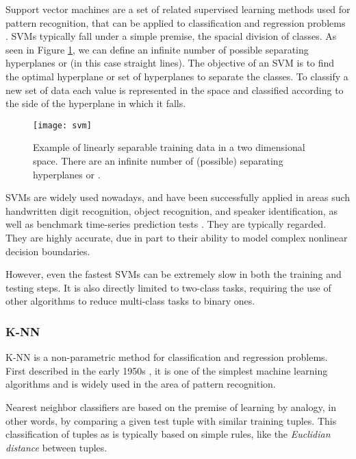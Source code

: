 Support vector machines are a set of related supervised learning methods used
for pattern recognition, that can be applied to classification and regression
problems \cite{Cortes1995}. SVMs typically fall under a simple premise, the
spacial division of classes. As seen in Figure \ref{fig:svm}, we can define an
infinite number of possible separating hyperplanes or 
(in this case straight lines). The objective of an SVM is to find the optimal
hyperplane or set of hyperplanes to separate the classes. To classify a new set
of data each value is represented in the space and classified according to the
side of the hyperplane in which it falls.

\begin{figure}[!htb]
  \begin{center}
    \leavevmode
    \texttt{[image: svm]}
    \caption[Example of linearly separable training data]
    {Example of linearly separable training data in a two dimensional
    space. There are an infinite number of (possible) separating hyperplanes or
     \cite[p. 338]{han2006data}.}
    \label{fig:svm}
  \end{center}
\end{figure}

SVMs are widely used nowadays, and have been successfully applied in areas such
handwritten digit recognition, object recognition, and speaker identification,
as well as benchmark time-series prediction tests \cite{han2006data}. They are
typically regarded. They are highly accurate, due in part to their ability to
model complex nonlinear decision boundaries.

However, even the fastest SVMs can be extremely slow in both the training and
testing steps. It is also directly limited to two-class tasks, requiring the use
of other algorithms to reduce multi-class tasks to binary ones.

\subsubsection*{K-NN}

K-NN is a non-parametric method for classification and regression problems.
First described in the early 1950s \cite{han2006data}, it is one of the simplest
machine learning algorithms and is widely used in the area of pattern
recognition.

Nearest neighbor classifiers are based on the premise of learning by analogy, in
other words, by comparing a given test tuple with similar training tuples. This
classification of tuples as  is typically based on simple rules,
like the \textit{Euclidian distance} between tuples.

